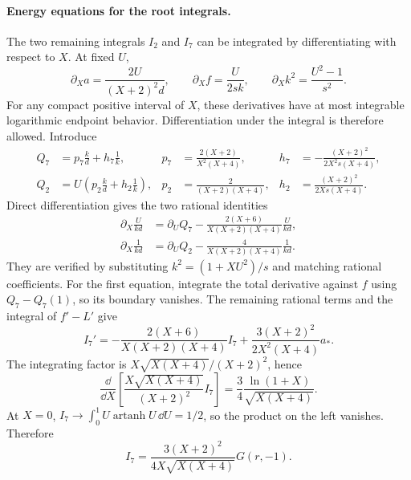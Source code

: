 \paragraph{Energy equations for the root integrals.} The two remaining
integrals $I_2$ and $I_7$ can be integrated by differentiating with
respect to $X$. At fixed $U$,
\begin{equation}
 \partial_X a=\frac{2U}{(X+2)^2d},\qquad
 \partial_X f=\frac{U}{2sk},\qquad
 \partial_X k^2=\frac{U^2-1}{s^2}.
\end{equation}
For any compact positive interval of $X$, these derivatives have at
most integrable logarithmic endpoint behavior. Differentiation under
the integral is therefore allowed. Introduce
\begin{align}
 Q_7&=p_7\frac{k}{d}+h_7\frac1k,&
 p_7&=\frac{2(X+2)}{X^2(X+4)},&
 h_7&=-\frac{(X+2)^2}{2X^2s(X+4)},\\
 Q_2&=U\left(p_2\frac{k}{d}+h_2\frac1k\right),&
 p_2&=\frac2{(X+2)(X+4)},&
 h_2&=\frac{(X+2)^2}{2Xs(X+4)}.
\end{align}
Direct differentiation gives the two rational identities
\begin{align}
 \partial_X\frac{U}{kd}
 &=\partial_UQ_7-\frac{2(X+6)}{X(X+2)(X+4)}\frac{U}{kd},\\
 \partial_X\frac1{kd}
 &=\partial_UQ_2-\frac4{X(X+2)(X+4)}\frac1{kd}.
\end{align}
They are verified by substituting $k^2=(1+XU^2)/s$ and matching
rational coefficients. For the first equation, integrate the total
derivative against $f$ using $Q_7-Q_7(1)$, so its boundary vanishes.
The remaining rational terms and the integral of $f'-L'$ give
\begin{equation}
 I_7'=-\frac{2(X+6)}{X(X+2)(X+4)}I_7
       +\frac{3(X+2)^2}{2X^2(X+4)}a_*.
\end{equation}
The integrating factor is $X\sqrt{X(X+4)}/(X+2)^2$, hence
\begin{equation}
 \frac{\dd}{\dd X}
 \left[\frac{X\sqrt{X(X+4)}}{(X+2)^2}I_7\right]
 =\frac34\frac{\ln(1+X)}{\sqrt{X(X+4)}}.
\end{equation}
At $X=0$, $I_7\to\int_0^1U\operatorname{artanh}U\,\dd U=1/2$,
so the product on the left vanishes. Therefore
\begin{equation}
 I_7=\frac{3(X+2)^2}{4X\sqrt{X(X+4)}}G(r,-1).
 \label{eq:comp-ck-I7-energy}
\end{equation}

